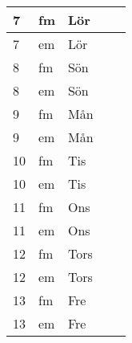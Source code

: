 \documentclass[a4paper]{article}
\begin{document}
\begin{table}[ht!]
\begin{tabular}{lllp{7cm}p{7cm}}
\multicolumn{1}{|l|}{7} & \multicolumn{1}{l|}{fm} & \multicolumn{1}{l|}{Lör} & \multicolumn{1}{l|}{} & \multicolumn{1}{l|}{} \\ \hline
\multicolumn{1}{|l|}{7} & \multicolumn{1}{l|}{em} & \multicolumn{1}{l|}{Lör} & \multicolumn{1}{l|}{} & \multicolumn{1}{l|}{} \\ \hline    

\multicolumn{1}{|l|}{8} & \multicolumn{1}{l|}{fm} & \multicolumn{1}{l|}{Sön} & \multicolumn{1}{l|}{} & \multicolumn{1}{l|}{} \\ \hline
\multicolumn{1}{|l|}{8} & \multicolumn{1}{l|}{em} & \multicolumn{1}{l|}{Sön} & \multicolumn{1}{l|}{} & \multicolumn{1}{l|}{} \\ \hline    

\multicolumn{1}{|l|}{9} & \multicolumn{1}{l|}{fm} & \multicolumn{1}{l|}{Mån} & \multicolumn{1}{l|}{} & \multicolumn{1}{l|}{} \\ \hline
\multicolumn{1}{|l|}{9} & \multicolumn{1}{l|}{em} & \multicolumn{1}{l|}{Mån} & \multicolumn{1}{l|}{} & \multicolumn{1}{l|}{} \\ \hline    

\multicolumn{1}{|l|}{10} & \multicolumn{1}{l|}{fm} & \multicolumn{1}{l|}{Tis} & \multicolumn{1}{l|}{} & \multicolumn{1}{l|}{} \\ \hline
\multicolumn{1}{|l|}{10} & \multicolumn{1}{l|}{em} & \multicolumn{1}{l|}{Tis} & \multicolumn{1}{l|}{} & \multicolumn{1}{l|}{} \\ \hline    

\multicolumn{1}{|l|}{11} & \multicolumn{1}{l|}{fm} & \multicolumn{1}{l|}{Ons} & \multicolumn{1}{l|}{} & \multicolumn{1}{l|}{} \\ \hline
\multicolumn{1}{|l|}{11} & \multicolumn{1}{l|}{em} & \multicolumn{1}{l|}{Ons} & \multicolumn{1}{l|}{} & \multicolumn{1}{l|}{} \\ \hline    

\multicolumn{1}{|l|}{12} & \multicolumn{1}{l|}{fm} & \multicolumn{1}{l|}{Tors} & \multicolumn{1}{l|}{} & \multicolumn{1}{l|}{} \\ \hline
\multicolumn{1}{|l|}{12} & \multicolumn{1}{l|}{em} & \multicolumn{1}{l|}{Tors} & \multicolumn{1}{l|}{} & \multicolumn{1}{l|}{} \\ \hline    

\multicolumn{1}{|l|}{13} & \multicolumn{1}{l|}{fm} & \multicolumn{1}{l|}{Fre} & \multicolumn{1}{l|}{} & \multicolumn{1}{l|}{} \\ \hline
\multicolumn{1}{|l|}{13} & \multicolumn{1}{l|}{em} & \multicolumn{1}{l|}{Fre} & \multicolumn{1}{l|}{} & \multicolumn{1}{l|}{} \\ \hline    


\end{tabular}
\end{table}
\end{document}
